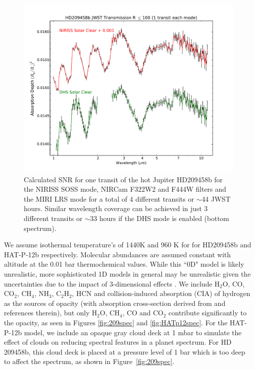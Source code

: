 \documentclass[iop]{emulateapj}
\begin{document}
\begin{figure}[!b]
\centering
\includegraphics[width=1.0\columnwidth]{HD209458b_solar_clear_1transit_DHS_vs_NIRISS_NIRCam_MIRILRS_R100.pdf}
\caption{Calculated SNR for one transit of the hot Jupiter HD209458b for the NIRISS SOSS mode, NIRCam F322W2 and F444W filters and the MIRI LRS mode for a total of 4 different transits or $\sim$44 JWST hours.
Similar wavelength coverage can be achieved in just 3 different transits or $\sim$33 hours if the DHS mode is enabled (bottom spectrum).}\label{fig:DHSvsNIRISS209}
\end{figure}

We assume isothermal temperature's of 1440K and 960 K for for HD209458b and HAT-P-12b respectively. Molecular abundances are assumed constant with altitude at the 0.01 bar thermochemical values. While this ``0D" model is likely unrealistic, more sophisticated 1D models in general may be unrealistic given the uncertainties due to the impact of 3-dimensional effects \citep[e.g.][]{line2016nonUclouds,feng2016nonUniform}. We include H$_2$O, CO, CO$_2$, CH$_4$, NH$_3$, C$_2$H$_2$, HCN and collision-induced absorption (CIA) of hydrogen as the sources of opacity (with absorption cross-section derived from \citet{freedman2014opacities} and references therein), but only H$_2$O, CH$_4$, CO and CO$_2$ contribute significantly to the opacity, as seen in Figures \ref{fig:209spec} and \ref{fig:HATp12spec}.
For the HAT-P-12b model, we include an opaque gray cloud deck at 1 mbar to simulate the effect of clouds on reducing spectral features in a planet spectrum.
For HD 209458b, this cloud deck is placed at a pressure level of 1 bar which is too deep to affect the spectrum, as shown in Figure~\ref{fig:209spec}.
\end{document}
